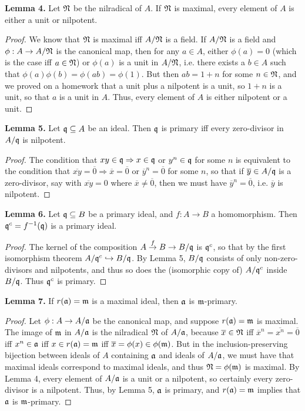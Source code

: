 \documentclass[11pt]{article}
\begin{document}
{\bf Lemma 4.} Let $\frak{N}$ be the nilradical of $A$. If $\frak{N}$ is maximal, every element of $A$ is either a unit or nilpotent.
\begin{proof}
We know that $\frak{N}$ is maximal iff $A/\frak{N}$ is a field. If $A/\frak{N}$ is a field and $\phi:A\rightarrow A/\frak{N}$ is the canonical map, then for any $a\in A$, either $\phi(a)=0$ (which is the case iff $a\in\frak{N}$) or $\phi(a)$ is a unit in $A/\frak{N}$, i.e. there exists a $b\in A$ such that $\phi(a)\phi(b)=\phi(ab)=\phi(1)$. But then $ab=1+n$ for some $n\in\frak{N}$, and we proved on a homework that a unit plus a nilpotent is a unit, so $1+n$ is a unit, so that $a$ is a unit in $A$. Thus, every element of $A$ is either nilpotent or a unit.
\end{proof}
\pagebreak
{\bf Lemma 5.} Let $\frak{q}\subseteq A$ be an ideal. Then $\frak{q}$ is primary iff every zero-divisor in $A/\frak{q}$ is nilpotent.
\begin{proof}
The condition that $xy\in\frak{q}\Rightarrow x\in\frak{q}$ or $y^n\in\frak{q}$ for some $n$ is equivalent to the condition that $\overline{xy}=\overline{0}\Rightarrow\overline{x}=\overline{0}$ or $\overline{y}^n=\overline{0}$ for some $n$, so that if $\overline{y}\in A/\frak{q}$ is a zero-divisor, say with $\overline{xy}=0$ where $\overline{x}\neq\overline{0}$, then we must have $\overline{y}^n=\overline{0}$, i.e. $\overline{y}$ is nilpotent.
\end{proof}

{\bf Lemma 6.} Let $\frak{q}\subseteq B$ be a primary ideal, and $f:A\rightarrow B$ a homomorphism. Then $\frak{q}^c=f^{-1}(\frak{q})$ is a primary ideal.
\begin{proof}
The kernel of the composition $A\stackrel{f}{\rightarrow}B\rightarrow B/\frak{q}$ is $\frak{q}^c$, so that by the first isomorphism theorem $A/\frak{q}^c\hookrightarrow B/\frak{q}$. By Lemma 5, $B/\frak{q}$ consists of only non-zero-divisors and nilpotents, and thus so does the (isomorphic copy of) $A/\frak{q}^c$ inside $B/\frak{q}$. Thus $\frak{q}^c$ is primary.
\end{proof}

{\bf Lemma 7.} If $r(\frak{a})=\frak{m}$ is a maximal ideal, then $\frak{a}$ is $\frak{m}$-primary.
\begin{proof} 
Let $\phi:A\rightarrow A/\frak{a}$ be the canonical map, and suppose $r(\frak{a})=\frak{m}$ is maximal. The image of $\frak{m}$ in $A/\frak{a}$ is the nilradical $\frak{N}$ of $A/\frak{a}$, because $\overline{x}\in\frak{N}$ iff $\overline{x}^n=\overline{x^n}=\overline{0}$ iff $x^n\in\frak{a}$ iff $x\in r(\frak{a})=\frak{m}$ iff $\overline{x}=\phi(x)\in\phi(\frak{m})$. But in the inclusion-preserving bijection between ideals of $A$ containing $\frak{a}$ and ideals of $A/\frak{a}$, we must have that maximal ideals correspond to maximal ideals, and thus $\frak{N}=\phi(\frak{m})$ is maximal. By Lemma 4, every element of $A/\frak{a}$ is a unit or a nilpotent, so certainly every zero-divisor is a nilpotent. Thus, by Lemma 5, $\frak{a}$ is primary, and $r(\frak{a})=\frak{m}$ implies that $\frak{a}$ is $\frak{m}$-primary.
\end{proof}
\end{document}
